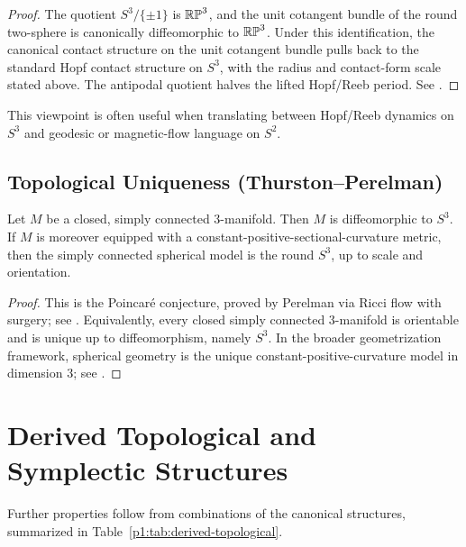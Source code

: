 \documentclass[11pt]{article}
\begin{document}
\begin{proof}
The quotient \(S^3/\{\pm1\}\) is \(\mathbb{RP}^3\), and the unit cotangent bundle of the round two-sphere is canonically diffeomorphic to \(\mathbb{RP}^3\).  Under this identification, the canonical contact structure on the unit cotangent bundle pulls back to the standard Hopf contact structure on \(S^3\), with the radius and contact-form scale stated above.  The antipodal quotient halves the lifted Hopf/Reeb period.  See \cite{CasalsSpacil2015}.
\end{proof}

\begin{remark}
This viewpoint is often useful when translating between Hopf/Reeb dynamics on
\(S^3\) and geodesic or magnetic-flow language on \(S^2\).
\end{remark}


\subsection{Topological Uniqueness (Thurston--Perelman)}
\begin{theorem}
\label{p1:thm:poincare-topological-uniqueness}
Let \(M\) be a closed, simply connected \(3\)-manifold. Then \(M\) is diffeomorphic to \(S^3\).  If \(M\) is moreover equipped with a constant-positive-sectional-curvature metric, then the simply connected spherical model is the round \(S^3\), up to scale and orientation.
\end{theorem}
\begin{proof}
This is the Poincar\'e conjecture, proved by Perelman via Ricci flow with surgery; see \cite{Perelman2002entropy,Perelman2003surgery,Perelman2003extinction}. Equivalently, every closed simply connected \(3\)-manifold is orientable and is unique up to diffeomorphism, namely \(S^3\). In the broader geometrization framework, spherical geometry is the unique constant-positive-curvature model in dimension \(3\); see \cite{Thurston1997}.
\end{proof}


\section{Derived Topological and Symplectic Structures}
\label{p1:sec:derived-topological}

Further properties follow from combinations of the canonical structures, summarized in Table~\ref{p1:tab:derived-topological}.
\end{document}
